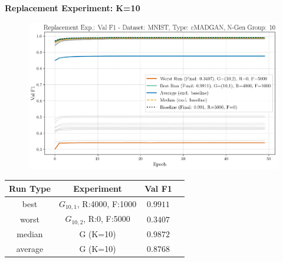 \noindent\textbf{Replacement Experiment: K=10}
\begin{figure}[htbp]
	\centering
	\includegraphics[width=.85\textwidth]{abb/strat_classifier_performance/MNIST_STRATIFIED_CLASSIFIERS_cMADGAN_NEW/replacement_experiments/val_f1_score_cMADGAN_MNIST_n_gen_10_all.png}
	\label{fig:app_strat_class_performance_replacement_exp._val_f1_score_10}
\end{figure}
\begin{table}[H]
	\vspace{-1em}
	\centering
	\begin{tabular}{|c|c|c|c|}
		\hline
		Run Type & Experiment & Val F1 \\ \hline
		best & \(G_{10, 1}\), R:4000, F:1000 & $0.9911$\\ \hline
		worst & \(G_{10, 2}\), R:0, F:5000 & $0.3407$\\ \hline
		median & G (K=10) & $0.9872$\\ \hline
		average & G (K=10) & $0.8768$
		\\ \hline
	\end{tabular}
\end{table}
\newpage
